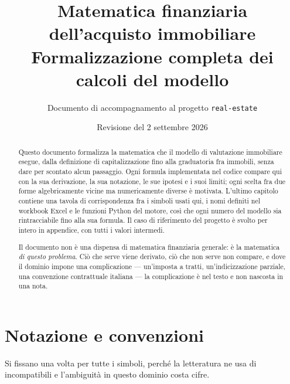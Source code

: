 \documentclass[11pt,a4paper]{article}
\title{Matematica finanziaria dell'acquisto immobiliare\\[0.3em]
\large Formalizzazione completa dei calcoli del modello}
\author{Documento di accompagnamento al progetto \texttt{real-estate}}
\date{Revisione del 2 settembre 2026}
\theoremstyle{definition}
\theoremstyle{plain}
\begin{document}
\maketitle

\begin{abstract}
\noindent Questo documento formalizza la matematica che il modello di valutazione immobiliare esegue, dalla definizione di capitalizzazione fino alla graduatoria fra immobili, senza dare per scontato alcun passaggio. Ogni formula implementata nel codice compare qui con la sua derivazione, la sua notazione, le sue ipotesi e i suoi limiti; ogni scelta fra due forme algebricamente vicine ma numericamente diverse è motivata. L'ultimo capitolo contiene una tavola di corrispondenza fra i simboli usati qui, i nomi definiti nel workbook Excel e le funzioni Python del motore, così che ogni numero del modello sia rintracciabile fino alla sua formula. Il caso di riferimento del progetto è svolto per intero in appendice, con tutti i valori intermedi.

Il documento non è una dispensa di matematica finanziaria generale: è la matematica \emph{di questo problema}. Ciò che serve viene derivato, ciò che non serve non compare, e dove il dominio impone una complicazione — un'imposta a tratti, un'indicizzazione parziale, una convenzione contrattuale italiana — la complicazione è nel testo e non nascosta in una nota.
\end{abstract}

\tableofcontents
\newpage

\section{Notazione e convenzioni}

Si fissano una volta per tutte i simboli, perché la letteratura ne usa di incompatibili e l'ambiguità in questo dominio costa cifre.
\end{document}
